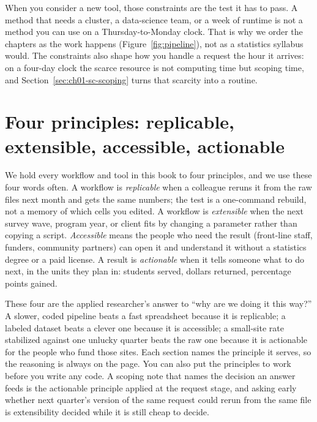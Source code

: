 When you consider a new tool, those constraints are the test it has to pass. A method that needs a cluster, a data-science team, or a week of runtime is not a method you can use on a Thursday-to-Monday clock. That is why we order the chapters as the work happens (Figure~\ref{fig:pipeline}), not as a statistics syllabus would. The constraints also shape how you handle a request the hour it arrives: on a four-day clock the scarce resource is not computing time but scoping time, and Section~\ref{sec:ch01-sc-scoping} turns that scarcity into a routine.

\section{Four principles: replicable, extensible, accessible, actionable}\label{sec:principles}
We hold every workflow and tool in this book to four principles, and we use these four words often. A workflow is \emph{replicable} when a colleague reruns it from the raw files next month and gets the same numbers; the test is a one-command rebuild, not a memory of which cells you edited. A workflow is \emph{extensible} when the next survey wave, program year, or client fits by changing a parameter rather than copying a script. \emph{Accessible} means the people who need the result (front-line staff, funders, community partners) can open it and understand it without a statistics degree or a paid license. A result is \emph{actionable} when it tells someone what to do next, in the units they plan in: students served, dollars returned, percentage points gained.

These four are the applied researcher's answer to \enquote{why are we doing it this way?} A slower, coded pipeline beats a fast spreadsheet because it is replicable; a labeled dataset beats a clever one because it is accessible; a small-site rate stabilized against one unlucky quarter beats the raw one because it is actionable for the people who fund those sites. Each section names the principle it serves, so the reasoning is always on the page. You can also put the principles to work before you write any code. A scoping note that names the decision an answer feeds is the actionable principle applied at the request stage, and asking early whether next quarter's version of the same request could rerun from the same file is extensibility decided while it is still cheap to decide.

